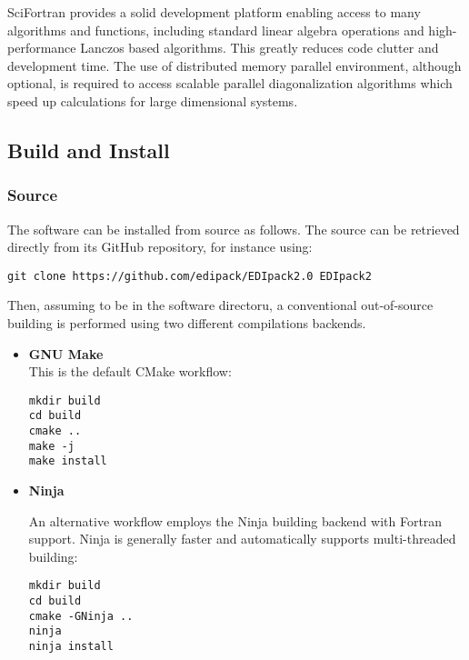 \documentclass[preprint,3p,10pt]{elsarticle}
\begin{document}
SciFortran provides a solid development platform enabling access to
many algorithms and functions, including standard linear algebra
operations and high-performance Lanczos based algorithms. This
greatly reduces code clutter and development time.
The use of distributed memory parallel environment, although optional,
is required to access scalable parallel diagonalization algorithms
which speed up calculations for large dimensional systems. 

\subsection{Build and Install}
\subsubsection{Source}
The software can be installed from source as follows. The source can
be retrieved directly from its GitHub repository, for instance using:
\begin{lstlisting}[style=mybash]
git clone https://github.com/edipack/EDIpack2.0 EDIpack2
\end{lstlisting}
Then, assuming to be in the software directoru, a conventional
out-of-source building is performed using two different compilations
backends.

\begin{itemize}
  \item {\bf GNU Make}\\
This is the default CMake workflow:
\begin{lstlisting}[style=mybash]
mkdir build
cd build
cmake ..
make -j
make install
\end{lstlisting}


\item{\bf Ninja}

An alternative workflow employs the Ninja building backend with
Fortran support. Ninja is generally faster and automatically supports
multi-threaded building:
\begin{lstlisting}[style=mybash]
mkdir build
cd build
cmake -GNinja ..
ninja
ninja install
\end{lstlisting}
\end{itemize}
\end{document}
